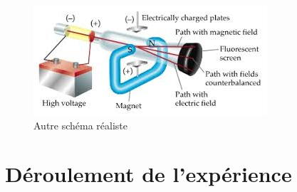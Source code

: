 \documentclass[../main.tex]{subfiles}
\begin{document}
\begin{figure}[h!]
    \centering
    \includegraphics[scale=0.3]{images/08.JJ-Thomson..jpg}
    \caption{Autre schéma réaliste}
    \label{fig:my_label}
\end{figure}

\section{Déroulement de l'expérience}
\end{document}
